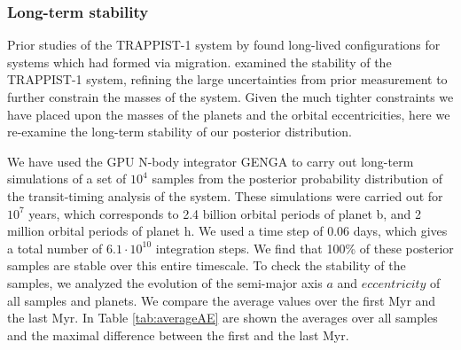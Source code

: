 \documentclass[fleqn,usenatbib]{mnras} %
\begin{document}
\subsubsection{Long-term stability}

Prior studies of the TRAPPIST-1 system by 
\citet{Tamayo2017} found long-lived configurations for
systems which had formed via migration.  \citet{Quarles2017} examined the stability
of the TRAPPIST-1 system,  refining the large uncertainties from prior
measurement \citep{Gillon2017} to further constrain the masses of
the system.  Given the much tighter constraints we have placed upon
the masses of the planets and the orbital eccentricities, here we
re-examine the long-term stability of our posterior distribution.

We have used the GPU N-body integrator GENGA \citep{Grimm2014} to carry out long-term simulations of a set of $10^4$ samples from the posterior probability distribution of the transit-timing analysis of the system.  These simulations were carried out for $10^7$ years, which corresponds to 2.4 billion orbital periods of planet b, and 2 million orbital periods of planet h. We used a time step of 0.06 days, which gives a total number of $6.1 \cdot 10^{10}$ integration steps. We find that 100\% of these posterior samples are stable over this entire timescale. %
To check the stability of the samples, we analyzed the evolution of the semi-major axis $a$ and $eccentricity$ of all samples and planets. We compare the average values over the first Myr and the last Myr. In Table \ref{tab:averageAE} are shown the averages over all samples and the maximal difference between the first and the last Myr. 
\end{document}
